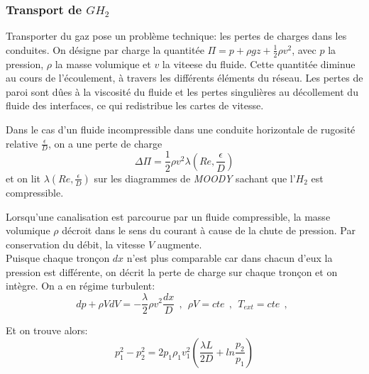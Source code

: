 \documentclass[11pt,french,a4paper]{article}
\begin{document}
\subsubsection{Transport de $GH_2$}

Transporter du gaz pose un problème technique: les pertes de charges dans les conduites. On désigne par charge la quantitée $\Pi = p+\rho g z + \frac{1}{2}\rho v^2$, avec $p$ la pression, $ \rho$ la masse volumique et $v$ la viteese du fluide. Cette quantitée diminue au cours de l'écoulement, à travers les différents éléments du réseau. Les pertes de paroi sont dûes à la viscosité du fluide et les pertes singulières au décollement du fluide des interfaces, ce qui redistribue les cartes de vitesse.

Dans le cas d'un fluide incompressible dans une conduite horizontale de rugosité relative $\frac{\epsilon}{D}$, on a une perte de charge $$ \Delta \Pi = \frac{1}{2} \rho v^2 \lambda ( Re, \frac{\epsilon}{D}) $$ et on lit $\lambda ( Re, \frac{\epsilon}{D}) $ sur les diagrammes de \emph{MOODY} sachant que l'$H_2$ est compressible.

Lorsqu'une canalisation est parcourue par un fluide compressible, la masse volumique $\rho$ décroit dans le sens du courant à cause de la chute de pression. Par conservation du débit, la vitesse $V$ augmente. \\ Puisque chaque tronçon $dx$ n'est plus comparable car dans chacun d'eux la pression est différente, on décrit la perte de charge sur chaque tronçon et on intègre. 
On a en régime turbulent: 
$$
 	dp + \rho V dV= -\frac{\lambda}{2}\rho v^2 \frac{dx}{D} \ \ , \ \
 	\rho V =cte  \ \ , \ \
 	T_{ext}=cte  \ \ , \ \
 $$
 
Et on trouve alors:
$$ p_1^2 - p_2^2 =2 p_1 \rho_1 v_1^2 (\frac{\lambda L}{2 D} + ln\frac{p_2}{p_1}) $$
\end{document}
